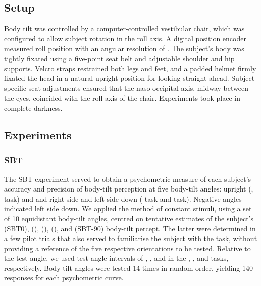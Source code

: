 \subsection{Setup}

Body tilt was controlled by a computer-controlled vestibular chair, which was configured to allow subject rotation in the roll axis. A digital position encoder measured roll position with an angular resolution of . The subject's body was tightly fixated using a five-point seat belt and adjustable shoulder and hip supports. Velcro straps restrained both legs and feet, and a padded helmet firmly fixated the head in a natural upright position for looking straight ahead. Subject-specific seat adjustments ensured that the naso-occipital axis, midway between the eyes, coincided with the roll axis of the chair. Experiments took place in complete darkness.

\subsection{Experiments}
\label{p1:sec:experiments}

\subsubsection{SBT}
\label{p1:sec:methods_sbt}

The SBT experiment served to obtain a psychometric measure of each subject's accuracy and precision of body-tilt perception at five body-tilt angles: upright (,  task) and  and  right side and left side down ( task and  task). Negative angles indicated left side down. We applied the method of constant stimuli, using a set of 10 equidistant body-tilt angles, centred on tentative estimates of the subject's  (SBT0),  (),  (),  (), and  (SBT-90) body-tilt percept. The latter were determined in a few pilot trials that also served to familiarise the subject with the task, without providing a reference of the five respective orientations to be tested. Relative to the test angle, we used test angle intervals of , , and  in the , , and  tasks, respectively. Body-tilt angles were tested 14 times in random order, yielding 140 responses for each psychometric curve.

